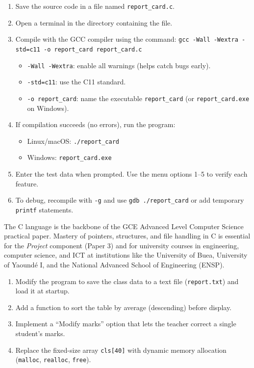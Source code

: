 \documentclass[11pt]{article}
\begin{document}
\begin{methode}
\begin{enumerate}
\item Save the source code in a file named \texttt{report\_card.c}.
\item Open a terminal in the directory containing the file.
\item Compile with the GCC compiler using the command:
      \texttt{gcc -Wall -Wextra -std=c11 -o report\_card report\_card.c}
      \begin{itemize}
      \item \texttt{-Wall -Wextra}: enable all warnings (helps catch bugs early).
      \item \texttt{-std=c11}: use the C11 standard.
      \item \texttt{-o report\_card}: name the executable \texttt{report\_card} (or \texttt{report\_card.exe} on Windows).
      \end{itemize}
\item If compilation succeeds (no errors), run the program:
      \begin{itemize}
      \item Linux/macOS: \texttt{./report\_card}
      \item Windows: \texttt{report\_card.exe}
      \end{itemize}
\item Enter the test data when prompted. Use the menu options 1--5 to verify each feature.
\item To debug, recompile with \texttt{-g} and use \texttt{gdb ./report\_card} or add temporary \texttt{printf} statements.
\end{enumerate}
\end{methode}

\begin{savaistu}
The C language is the backbone of the GCE Advanced Level Computer Science practical paper. Mastery of pointers, structures, and file handling in C is essential for the \emph{Project} component (Paper 3) and for university courses in engineering, computer science, and ICT at institutions like the University of Buea, University of Yaoundé I, and the National Advanced School of Engineering (ENSP).
\end{savaistu}

\begin{exercice}
\begin{enumerate}
\item Modify the program to save the class data to a text file (\texttt{report.txt}) and load it at startup.
\item Add a function to sort the table by average (descending) before display.
\item Implement a ``Modify marks'' option that lets the teacher correct a single student's marks.
\item Replace the fixed-size array \texttt{cls[40]} with dynamic memory allocation (\texttt{malloc}, \texttt{realloc}, \texttt{free}).
\end{enumerate}
\end{exercice}
\end{document}
